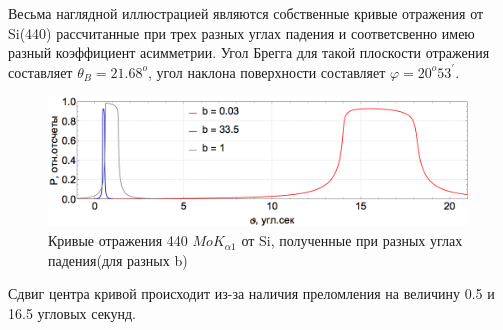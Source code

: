 \label{sec:rocking_curve_section}
Весьма наглядной иллюстрацией являются собственные кривые отражения от Si(440) рассчитанные при
трех разных углах падения и соответсвенно имею разный коэффициент асимметрии. Угол
Брегга для такой плоскости отражения составляет $\theta_B = 21.68^o$, угол наклона поверхности
составляет $\varphi = 20^o 53^{'}$.

\begin{figure}[H]
\centering
\includegraphics[width=0.99\textwidth]{images/rocking_curve_assym_3.png}
\caption{Кривые отражения 440 $MoK_{\alpha 1}$ от Si, полученные при разных углах падения(для разных b)}
\label{ris:rocking_curve_assym_3}
\end{figure}
Сдвиг центра кривой происходит из-за наличия преломления на величину 0.5 и 16.5 угловых секунд.

